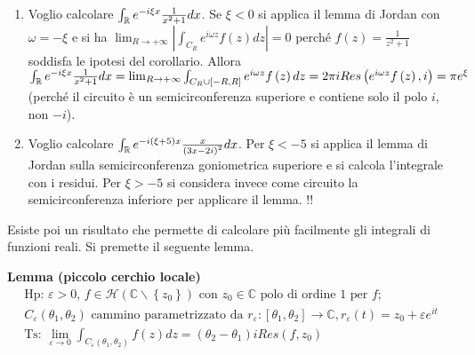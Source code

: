 \documentclass{article}
\begin{document}
\begin{enumerate}
\item Voglio calcolare $\int_{%
\mathbb{R}
}e^{-i\xi x}\frac{1}{x^{2}+1}dx$. Se $\xi <0$ si applica il lemma di Jordan
con $\omega =-\xi $ e si ha $\lim_{R\rightarrow +\infty }\left\vert
\int_{C_{R}}e^{i\omega z}f\left( z\right) dz\right\vert =0$ perch\'{e} $%
f\left( z\right) =\frac{1}{z^{2}+1}$ soddisfa le ipotesi del corollario.
Allora $\int_{%
\mathbb{R}
}e^{-i\xi x}\frac{1}{x^{2}+1}dx=\lim_{R\rightarrow +\infty }\int_{C_{R}\cup %
\left[ -R,R\right] }e^{i\omega z}f\left( z\right) dz=2\pi iRes\left(
e^{i\omega z}f\left( z\right) ,i\right) =\pi e^{\xi }$ (perch\'{e} il
circuito \`{e} un semicirconferenza superiore e contiene solo il polo $i$,
non $-i$).

\item Voglio calcolare $\int_{%
\mathbb{R}
}e^{-i\left( \xi +5\right) x}\frac{x}{\left( 3x-2i\right) ^{2}}dx$. Per $\xi
<-5$ si applica il lemma di Jordan sulla semicirconferenza goniometrica
superiore e si calcola l'integrale con i residui. Per $\xi >-5$ si considera
invece come circuito la semicirconferenza inferiore per applicare il lemma.
!!
\end{enumerate}

Esiste poi un risultato che permette di calcolare pi\`{u} facilmente gli
integrali di funzioni reali. Si premette il seguente lemma.

\textbf{Lemma (piccolo cerchio locale) }%
\begin{gather*}
\text{Hp: }\varepsilon >0\text{, }f\in \mathcal{H}\left( 
\mathbb{C}
\backslash \left\{ z_{0}\right\} \right) \text{ con }z_{0}\in 
\mathbb{C}
\text{ polo di ordine }1\text{ per }f\text{; } \\
C_{\varepsilon }\left( \theta _{1},\theta _{2}\right) \text{ cammino
parametrizzato da }r_{\varepsilon }:\left[ \theta _{1},\theta _{2}\right]
\rightarrow 
\mathbb{C}
,r_{\varepsilon }\left( t\right) =z_{0}+\varepsilon e^{it} \\
\text{Ts: }\lim_{\varepsilon \rightarrow 0}\int_{C_{\varepsilon }\left(
\theta _{1},\theta _{2}\right) }f\left( z\right) dz=\left( \theta
_{2}-\theta _{1}\right) iRes\left( f,z_{0}\right)
\end{gather*}
\end{document}
